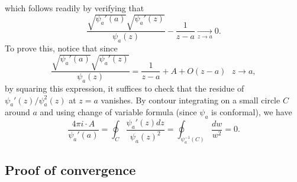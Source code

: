 \documentclass[oneside,english]{amsart}
\numberwithin{equation}{section}
\numberwithin{figure}{section}
\theoremstyle{plain}
\theoremstyle{plain}
\theoremstyle{plain}
\theoremstyle{plain}
\theoremstyle{plain}
\theoremstyle{definition}
\theoremstyle{remark}
\begin{document}
which follows readily by verifying that
\[
\frac{\sqrt{\psi_{a}'\left(a\right)}\sqrt{\psi_{a}'\left(z\right)}}{\psi_{a}\left(z\right)}-\frac{1}{z-a}\underset{z\to a}{\longrightarrow}0.
\]
To prove this, notice that since 
\[
\frac{\sqrt{\psi_{a}'\left(a\right)}\sqrt{\psi_{a}'\left(z\right)}}{\psi_{a}\left(z\right)}=\frac{1}{z-a}+A+O\left(z-a\right)\,\,\,\, z\to a,
\]
by squaring this expression, it suffices to check that the residue
of $\psi_{a}'\left(z\right)/\psi_{a}^{2}\left(z\right)$ at $z=a$
vanishes. By contour integrating on a small circle $C$ around $a$
and using change of variable formula (since $\psi_{a}$ is conformal),
we have
\[
\frac{4\pi i\cdot A}{\psi_{a}'\left(a\right)}=\oint_{C}\frac{\psi_{a}'\left(z\right)dz}{\psi_{a}\left(z\right)^{2}}=\oint_{\psi_{a}^{-1}\left(C\right)}\frac{dw}{w^{2}}=0.
\]



\subsection{Proof of convergence}
\end{document}
